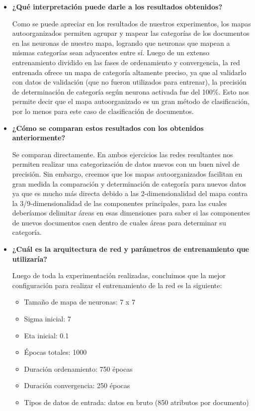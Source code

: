 \begin{itemize}

\item \textbf{¿Qué interpretación puede darle a los resultados obtenidos?} 

Como se puede apreciar en los resultados de nuestros experimentos, los mapas autoorganizados permiten agrupar y mapear las categorías
de los documentos en las neuronas de nuestro mapa, logrando que neuronas que mapean a mismas categorías sean adyacentes entre sí. Luego de
un extenso entrenamiento dividido en las fases de ordenamiento y convergencia, la red entrenada ofrece un mapa de categoría altamente 
preciso, ya que al validarlo con datos de validación (que no fueron utilizados para entrenar), la precisión de determinación de categoría 
según neurona activada fue del 100\%. Esto nos permite decir que el mapa autoorganizado es un gran método de clasificación, por lo menos para
este caso de clasificación de documentos.

\item \textbf{¿Cómo se comparan estos resultados con los obtenidos anteriormente?}

Se comparan directamente. En ambos ejercicios las redes resultantes nos permiten realizar una categorización de datos nuevos con un buen 
nivel de precisión. Sin embargo, creemos que los mapas autoorganizados facilitan en gran medida la comparación y determinación de categoría 
para nuevos datos ya que es mucho más directa debido a las 2-dimensionalidad del mapa contra la 3/9-dimensionalidad de las componentes principales, 
para las cuales deberíamos delimitar áreas en esas dimensiones para saber si las componentes de nuevos documentos caen dentro de cuales áreas para 
determinar su categoría.

\item \textbf{¿Cuál es la arquitectura de red y parámetros de entrenamiento que utilizaría?}

Luego de toda la experimentación realizadas, concluimos que la mejor configuración para realizar el entrenamiento de 
la red es la siguiente:

\begin{itemize}
\item Tamaño de mapa de neuronas: 7 x 7
\item Sigma inicial: 7
\item Eta inicial: 0.1
\item Épocas totales: 1000
\item Duración ordenamiento: 750 épocas
\item Duración convergencia: 250 épocas
\item Tipos de datos de entrada: datos en bruto (850 atributos por documento)
\end{itemize}


\end{itemize}
